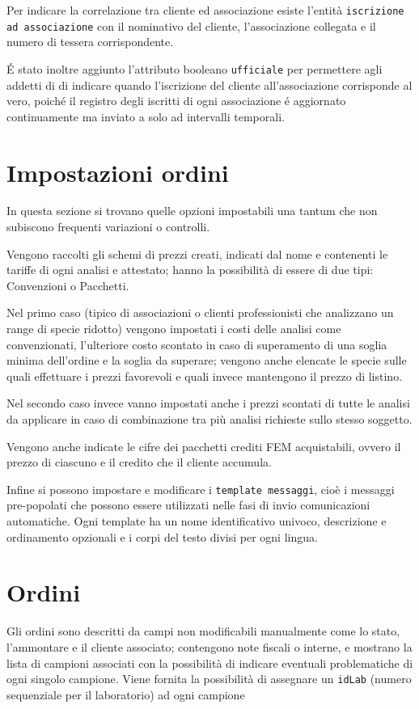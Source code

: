 Per indicare la correlazione tra cliente ed associazione esiste l'entità \texttt{iscrizione ad associazione} con il nominativo del cliente, l'associazione collegata e il numero di tessera corrispondente.

É stato inoltre aggiunto l'attributo booleano \texttt{ufficiale} per permettere agli addetti di {\fem} di indicare quando l'iscrizione del cliente all'associazione corrisponde al vero, poiché il registro degli iscritti di ogni associazione é aggiornato continuamente ma inviato a {\fem} solo ad intervalli temporali.

\section*{Impostazioni ordini}
In questa sezione si trovano quelle opzioni impostabili una tantum che non subiscono frequenti variazioni o controlli.

Vengono raccolti gli schemi di prezzi creati, indicati dal nome e contenenti le tariffe di ogni analisi e attestato; hanno la possibilità di essere di due tipi: Convenzioni o Pacchetti. 

Nel primo caso (tipico di associazioni o clienti professionisti che analizzano un range di specie ridotto) vengono impostati i costi delle analisi come convenzionati, l'ulteriore costo scontato in caso di superamento di una soglia minima dell'ordine e la soglia da superare; vengono anche elencate le specie sulle quali effettuare i prezzi favorevoli e quali invece mantengono il prezzo di listino.

Nel secondo caso invece vanno impostati anche i prezzi scontati di tutte le analisi da applicare in caso di combinazione tra più analisi richieste sullo stesso soggetto.

Vengono anche indicate le cifre dei pacchetti crediti FEM acquistabili, ovvero il prezzo di ciascuno e il credito che il cliente accumula.

Infine si possono impostare e modificare i \texttt{template messaggi}, cioè i messaggi pre-popolati che possono essere utilizzati nelle fasi di invio comunicazioni automatiche. Ogni template ha un nome identificativo univoco, descrizione e ordinamento opzionali e i corpi del testo divisi per ogni lingua.

\section*{Ordini}
Gli ordini sono descritti da campi non modificabili manualmente come lo stato, l'ammontare e il cliente associato; contengono note fiscali o interne, e mostrano la lista di campioni associati con la possibilità di indicare eventuali problematiche di ogni singolo campione. Viene fornita la possibilità di assegnare un \texttt{idLab} (numero sequenziale per il laboratorio) ad ogni campione

